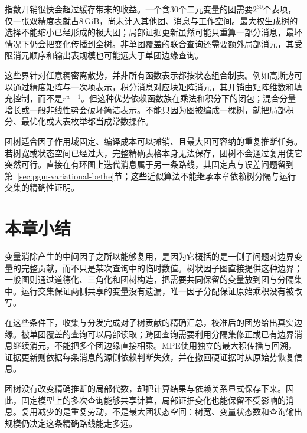 指数开销很快会超过缓存带来的收益。一个含$30$个二元变量的团需要$2^{30}$个表项，仅一张双精度表就占$8$\,GiB，尚未计入其他团、消息与工作空间。最大权生成树的选择不能缩小已经形成的极大团；局部证据更新虽然可能只重算一部分消息，最坏情况下仍会把变化传播到全树。非单团覆盖的联合查询还需要额外局部消元，其受限消元顺序和输出表规模也可能远大于单团边缘查询。

这些界针对任意稠密离散势，并非所有函数表示都按状态组合制表。例如高斯势可以通过精度矩阵与一次项表示，积分消息对应块矩阵消元，其开销由矩阵维数和填充控制，而不是$r^{w+1}$。但这种优势依赖函数族在乘法和积分下的闭包；混合分量增长或一般非线性势会破坏简洁表示。不能只因为图被编成一棵树，就把局部积分、最优化或大表枚举都当成常数操作。

团树适合因子作用域固定、编译成本可以摊销、且最大团可容纳的重复推断任务。若树宽或状态空间已经过大，完整精确表格本身无法保存，团树不会通过复用使它突然可行。直接在有环图上迭代消息属于另一条路线，其固定点与误差问题留到第~\ref{sec:pgm-variational-bethe}节；这些近似算法不能继承本章依赖树分隔与运行交集的精确性证明。

\section{本章小结}
\label{sec:pgm-junction-tree-summary}

变量消除产生的中间因子之所以能够复用，是因为它概括的是一侧子问题对边界变量的完整贡献，而不只是某次查询中的临时数值。树状因子图直接提供这种边界；一般图则通过道德化、三角化和团树构造，把需要共同保留的变量放到团与分隔集中。运行交集保证两侧共享的变量没有遗漏，唯一因子分配保证原始乘积没有被改写。

在这些条件下，收集与分发完成对子树贡献的精确汇总，校准后的团势给出真实边缘。被单团覆盖的查询可以局部读取；跨团查询需要利用分隔集修正或已有边界消息继续消元，不能把多个团边缘直接相乘。MPE使用独立的最大积传播与回溯，证据更新则依据每条消息的源侧依赖判断失效，并在撤回硬证据时从原始势恢复信息。

团树没有改变精确推断的局部代数，却把计算结果与依赖关系显式保存下来。因此，固定模型上的多次查询能够共享计算，局部证据变化也能保留不受影响的消息。复用减少的是重复劳动，不是最大团状态空间：树宽、变量状态数和查询输出规模仍决定这条精确路线能走多远。
